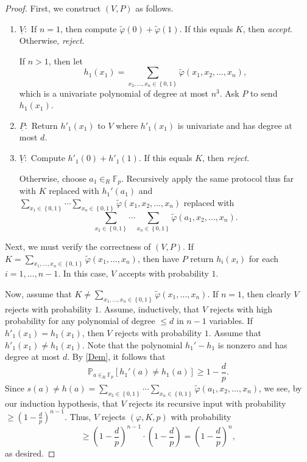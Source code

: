 \documentclass[10pt,letterpaper,cm]{nupset}
\theoremstyle{definition}
\theoremstyle{theorem}
\theoremstyle{remark}
\newcommand{\F}{\mathbb F}
\newcommand{\1}{\mathbf{1}}
\newcommand{\0}{\vec 0}
\begin{document}
\begin{proof} 
First, we construct $\left(V, P\right)$ as follows. 
\begin{enumerate}
\item $\underline{V}:$ If $n=1$, then compute $\tilde{\varphi}(0) + \tilde{\varphi}(1)$. If this equals $K$, then \textit{accept}. Otherwise, \textit{reject}. 

If $n>1$, then let $$h_1(x_1) = \sum_{x_2, \ldots, x_n \in \left\{0,1\right\}} \tilde{\varphi}(x_1, x_2, \ldots, x_n),$$ which is a univariate polynomial of degree at most $n^3$. Ask $P$ to send $h_1(x_1)$. 
\item $\underline{P}:$ Return  $h'_1(x_1)$ to $V$ where $h'_1(x_1)$ is univariate and has degree at most $d$. 
\item $\underline{V}:$ Compute $h'_1(0) + h'_1(1)$. If this equals $K$, then \textit{reject}. 

Otherwise,  choose $a_1 \in_R \F_p$. Recursively apply the same protocol thus far with $K$ replaced with $h_1'(a_1)$ and $ \sum_{x_1 \in \left\{0,1\right\}} \cdots \sum_{x_n \in \left\{0,1\right\}} \tilde{\varphi}(x_1, x_2, \ldots, x_n)$ replaced with $$\sum_{x_2 \in \left\{0,1\right\}} \cdots \sum_{x_n \in \left\{0,1\right\}} \tilde{\varphi}(a_1, x_2, \ldots, x_n).$$
\end{enumerate}
Next, we must verify the correctness of $\left(V,P\right)$. If $K = \sum_{x_1, \ldots, x_n \in \left\{0,1\right\}} \tilde{\varphi}(x_1, \ldots, x_n)$, then have $P$ return $h_i(x_i)$ for each $i=1, \ldots, {n-1}$. In this case, $V$ accepts with probability $1$. 

\medskip

 Now, assume that $K \ne \sum_{x_1, \ldots, x_n \in \left\{0,1\right\}} \tilde{\varphi}(x_1, \ldots, x_n)$.  If $n=1$, then clearly $V$ rejects with probability $1$. Assume, inductively, that $V$ rejects with high probability for any polynomial of degree $\leq d$ in $n-1$ variables. If $h'_1(x_1) = h_1(x_1)$, then $V$ rejects with probability $1$. Assume that $h'_1(x_1) \ne h_1(x_1)$.  Note that the polynomial $h_1' - h_1$ is nonzero and has degree at most $d$.  By \cref{Dem}, it follows that  $$\mathbb{P}_{a \in_R \F_p}\left[h_1'(a) \ne h_1(a)\right] \geq 1- \frac{d}{p}.$$ Since $s(a) \ne h(a) = \sum_{x_2 \in \left\{0,1\right\}} \cdots \sum_{x_n \in \left\{0,1\right\}} \tilde{\varphi}(a_1, x_2, \ldots, x_n)$, we see, by our induction hypothesis, that $V$ rejects its recursive input with probability $\geq (1-\frac{d}{p})^{n-1}$. Thus, $V$ rejects $\left(\varphi, K, p\right)$ with probability $$ \geq \left(1-\frac{d}{p}\right)^{n-1} \cdot \left(1-\frac{d}{p}\right) = \left(1-\frac{d}{p}\right)^{n},$$ as desired.
\end{proof}
\end{document}
